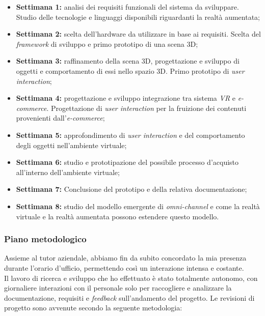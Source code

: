 \begin{itemize}
	\item \textbf{Settimana 1:} analisi dei requisiti funzionali del sistema da sviluppare. Studio delle tecnologie e linguaggi disponibili riguardanti la realtà aumentata;
	
	\item \textbf{Settimana 2:} scelta dell'hardware da utilizzare in base ai requisiti. Scelta del \textit{framework} di sviluppo e primo prototipo di una scena 3D;
	
	\item \textbf{Settimana 3:} raffinamento della scena 3D, progettazione e sviluppo di oggetti e comportamento di essi nello spazio 3D. Primo prototipo di \textit{user interaction};
	
	\item \textbf{Settimana 4:} progettazione e sviluppo integrazione tra sistema \textit{VR} e \textit{e-commerce}. Progettazione di \textit{user interaction} per la fruizione dei contenuti provenienti dall'\textit{e-commerce};
	
	\item \textbf{Settimana 5:} approfondimento di \textit{user interaction} e del comportamento degli oggetti nell'ambiente virtuale;
	
	\item \textbf{Settimana 6:} studio e prototipazione del possibile processo d'acquisto all'interno dell'ambiente virtuale;
	
	\item \textbf{Settimana 7:} Conclusione del prototipo e della relativa documentazione;
	
	\item \textbf{Settimana 8:} studio del modello emergente di \textit{omni-channel} e come la realtà virtuale e la realtà aumentata possono estendere questo modello.
\end{itemize}

\subsubsection{Piano metodologico}
	
Assieme al tutor aziendale, abbiamo fin da subito concordato la mia presenza durante l'orario d'ufficio, permettendo così un interazione intensa e costante. \\
Il lavoro di ricerca e sviluppo che ho effettuato è stato totalmente autonomo, con giornaliere interazioni con il personale solo per raccogliere e analizzare la documentazione, requisiti e \textit{feedback} sull'andamento del progetto.
Le revisioni di progetto sono avvenute secondo la seguente metodologia:

